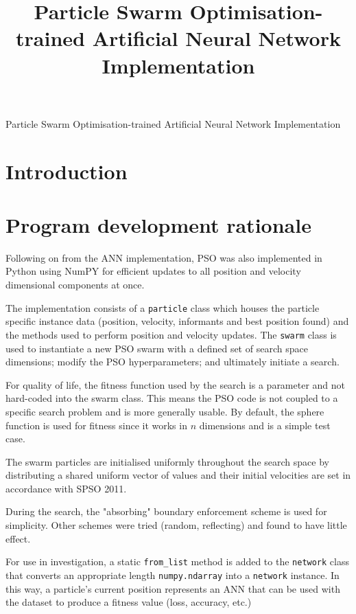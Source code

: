 \documentclass[12pt]{article}
\begin{document}
\title{Particle Swarm Optimisation-trained Artificial Neural Network Implementation}

\begin{center}
  \Large{Particle Swarm Optimisation-trained Artificial Neural Network Implementation}
\end{center}

\vspace{-2em}
\section{Introduction}


\vspace{-1.5em}
\section{Program development rationale}

Following on from the ANN implementation, PSO was also implemented in
Python using NumPY for efficient updates to all position and velocity
dimensional components at once.

The implementation consists of a \texttt{particle} class which houses the
particle specific instance data (position, velocity, informants and best position found) and the
methods used to perform position and velocity updates. The \texttt{swarm}
class is used to instantiate a new PSO swarm with a defined set of search space
dimensions; modify the PSO hyperparameters; and ultimately initiate a search.

For quality of life, the fitness function used by the search is a parameter
and not hard-coded into the swarm class. This means the PSO code is not coupled
to a specific search problem and is more generally usable. By default,
the sphere function is used for fitness since it works in \(n\) dimensions
and is a simple test case.

The swarm particles are initialised uniformly throughout the search space
by distributing a shared uniform vector of values and their initial velocities
are set in accordance with SPSO 2011. \cite{Clerc}

During the search, the "absorbing" \cite{Chu} boundary enforcement scheme is used
for simplicity. Other schemes were tried (random, reflecting) and found to have
little effect.

For use in investigation, a static \texttt{from\_list} method is added to
the \texttt{network} class that converts an appropriate length \texttt{numpy.ndarray}
into a \texttt{network} instance. In this way, a particle's current position
represents an ANN that can be used with the dataset to produce a fitness value (loss, accuracy, etc.)
\end{document}
